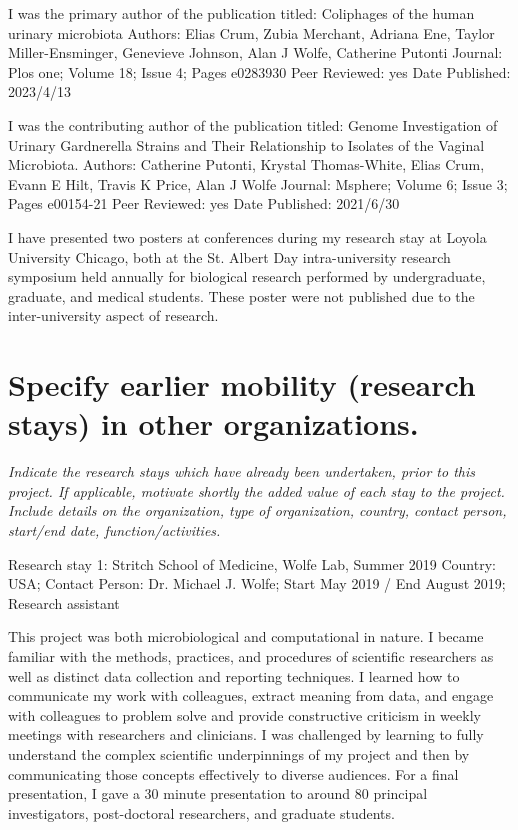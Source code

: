 {I was the primary author of the publication titled: Coliphages of the human urinary microbiota
Authors: Elias Crum, Zubia Merchant, Adriana Ene, Taylor Miller-Ensminger, Genevieve Johnson, Alan J Wolfe, Catherine Putonti
Journal: Plos one; Volume 18; Issue 4; Pages e0283930
Peer Reviewed: yes
Date Published: 2023/4/13

I was the contributing author of the publication titled: Genome Investigation of Urinary Gardnerella Strains and Their Relationship to Isolates of the Vaginal Microbiota.
Authors: Catherine Putonti, Krystal Thomas-White, Elias Crum, Evann E Hilt, Travis K Price, Alan J Wolfe
Journal: Msphere; Volume 6; Issue 3; Pages e00154-21
Peer Reviewed: yes
Date Published: 2021/6/30

I have presented two posters at conferences during my research stay at Loyola University Chicago, both at the St. Albert Day intra-university research symposium held annually for biological research performed by undergraduate, graduate, and medical students.
These poster were not published due to the inter-university aspect of research.




\section{Specify earlier mobility (research stays) in other organizations.}
\textit{
Indicate the research stays which have already been undertaken, prior to this project. 
If applicable, motivate shortly the added value of each stay to the project. 
Include details on the organization, type of organization, country, contact person, start/end date, function/activities.
}

Research stay 1: Stritch School of Medicine, Wolfe Lab, Summer 2019
Country: USA; Contact Person: Dr. Michael J. Wolfe; Start May 2019 / End August 2019; Research assistant

This project was both microbiological and computational in nature.
I became familiar with the methods, practices, and procedures of scientific researchers as well as distinct data collection and reporting techniques. 
I learned how to communicate my work with colleagues, extract meaning from data, and engage with colleagues to problem solve and provide constructive criticism in weekly meetings with researchers and clinicians.
I was challenged by learning to fully understand the complex scientific underpinnings of my project and then by communicating those concepts effectively to diverse audiences. 
For a final presentation, I gave a 30 minute presentation to around 80 principal investigators, post-doctoral researchers, and graduate students. 

}
